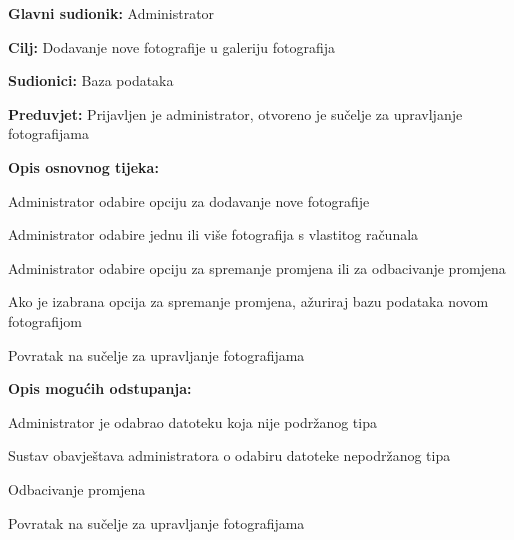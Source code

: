 					\noindent {}
					\begin{packed_item}
						
						\item \textbf{Glavni sudionik: }Administrator
						\item  \textbf{Cilj:} Dodavanje nove fotografije u galeriju fotografija
						\item  \textbf{Sudionici:} Baza podataka
						\item  \textbf{Preduvjet:} Prijavljen je administrator, otvoreno je sučelje za upravljanje fotografijama
						\item  \textbf{Opis osnovnog tijeka:}
						
						\item[] \begin{packed_enum}
							
							\item Administrator odabire opciju za dodavanje nove fotografije
							\item Administrator odabire jednu ili više fotografija s vlastitog računala
							\item Administrator odabire opciju za spremanje promjena ili za odbacivanje promjena
							\item Ako je izabrana opcija za spremanje promjena, ažuriraj bazu podataka novom fotografijom
							\item Povratak na sučelje za upravljanje fotografijama
						\end{packed_enum}
						
						\item  \textbf{Opis mogućih odstupanja:}
						
						\item[] \begin{packed_item}
							
							\item[2.a] Administrator je odabrao datoteku koja nije podržanog tipa
							\item[] \begin{packed_enum}
								
								\item Sustav obavještava administratora o odabiru datoteke nepodržanog tipa
								\item Odbacivanje promjena
								\item Povratak na sučelje za upravljanje fotografijama
								

\end{packed_enum}
\end{packed_item}
\end{packed_item}
